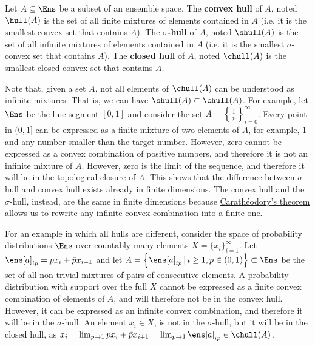 \begin{mathSection}
\begin{defn}
	Let $A \subseteq \Ens$ be a subset of an ensemble space. The \textbf{convex hull} of $A$, noted $\hull(A)$ is the set of all finite mixtures of elements contained in $A$ (i.e. it is the smallest convex set that contains $A$). The \textbf{$\sigma$-hull} of $A$, noted $\shull(A)$ is the set of all infinite mixtures of elements contained in $A$ (i.e. it is the smallest $\sigma$-convex set that contains $A$). The \textbf{closed hull} of $A$, noted $\chull(A)$ is the smallest closed convex set that contains $A$. 
\end{defn}

\begin{remark}
	Note that, given a set $A$, not all elements of $\chull(A)$ can be understood as infinite mixtures. That is, we can have $\shull(A) \subset \chull(A)$. For example, let $\Ens$ be the line segment $[0,1]$ and consider the set $A=\left\{\frac{1}{2^i}\right\}_{i=0}^{\infty}$. Every point in $(0,1]$ can be expressed as a finite mixture of two elements of $A$, for example, $1$ and any number smaller than the target number. However, zero cannot be expressed as a convex combination of positive numbers, and therefore it is not an infinite mixture of $A$. However, zero is the limit of the sequence, and therefore it will be in the topological closure of $A$. This shows that the difference between $\sigma$-hull and convex hull exists already in finite dimensions. The convex hull and the $\sigma$-hull, instead, are the same in finite dimensions because \href{https://en.wikipedia.org/wiki/Carath%C3%A9odory%27s_theorem_%28convex_hull%29}{Carathéodory's theorem} allows us to rewrite any infinite convex combination into a finite one.
	
	For an example in which all hulls are different, consider the space of probability distributions $\Ens$ over countably many elements $X = \{x_i\}_{i=1}^{\infty}$. Let $\ens[a]_{ip} = p x_i + \bar{p} x_{i+1}$ and let $A = \left\{ \ens[a]_{ip}  \, | \, i \geq 1, p \in (0,1)  \right\} \subset \Ens$ be the set of all non-trivial mixtures of pairs of consecutive elements. A probability distribution with support over the full $X$ cannot be expressed as a finite convex combination of elements of $A$, and will therefore not be in the convex hull. However, it can be expressed as an infinite convex combination, and therefore it will be in the $\sigma$-hull. An element $x_i \in X$, is not in the $\sigma$-hull, but it will be in the closed hull, as $x_i = \lim_{p \to 1} p x_i + \bar{p} x_{i+1} = \lim_{p \to 1} \ens[a]_{ip} \in \chull(A)$.
\end{remark}


\end{mathSection}
